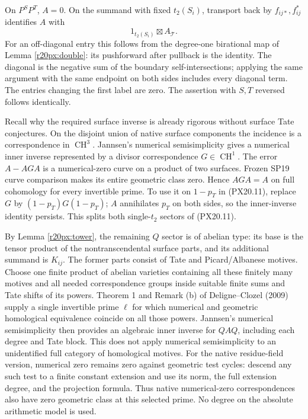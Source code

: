 On $P^SP^T$, $A=0$. On the summand with fixed $t_2(S_i)$,
transport back by $f_{ij*},f_{ij}^*$ identifies $A$ with
\[
                    1_{t_2(S_i)}\boxtimes A_{\mathcal T}.
 \tag{PX20.12}
\]
For an off-diagonal entry this follows from the degree-one
birational map of Lemma \ref{r20px:double}: its pushforward after
pullback is the identity. The diagonal is the negative sum of the
boundary self-intersections; applying the same argument with the
same endpoint on both sides includes every diagonal term. The
entries changing the first label are zero. The assertion with
$S,T$ reversed follows identically.

Recall why the required surface inverse is already rigorous without
surface Tate conjectures. On the disjoint union of native surface
components the incidence is a correspondence in $\operatorname{CH}^3$.
Jannsen's numerical semisimplicity gives a numerical inner inverse
represented by a divisor correspondence $G\in\operatorname{CH}^1$.
The error $A-AGA$ is a numerical-zero curve on a product of two
surfaces. Frozen SP19 curve comparison makes its entire geometric
class zero. Hence $AGA=A$ on full cohomology for every invertible
prime. To use it on $1-p_T$ in (PX20.11), replace $G$ by
$(1-p_T)G(1-p_T)$; $A$ annihilates $p_T$ on both sides, so the
inner-inverse identity persists. This splits both single-$t_2$
sectors of (PX20.11).

By Lemma \ref{r20px:tower}, the remaining $Q$ sector is of abelian
type: its base is the tensor product of the nontranscendental surface
parts, and its additional summand is $K_{ij}$. The former parts
consist of Tate and Picard/Albanese motives. Choose one finite product
of abelian varieties containing all these finitely many motives and
all needed correspondence groups inside suitable finite sums and
Tate shifts of its powers. Theorem 1 and Remark (b) of
Deligne--Clozel (2009) supply a single invertible prime $\ell$ for
which numerical and geometric homological equivalence coincide on
all those powers. Jannsen's numerical semisimplicity then provides
an algebraic inner inverse for $QAQ$, including each degree and
Tate block. This does not apply numerical semisimplicity to an
unidentified full category of homological motives.
For the native residue-field version, numerical zero remains zero
against geometric test cycles: descend any such test to a finite
constant extension and use its norm, the full extension degree,
and the projection formula. Thus native numerical-zero
correspondences also have zero geometric class at this selected
prime. No degree on the absolute arithmetic model is used.

